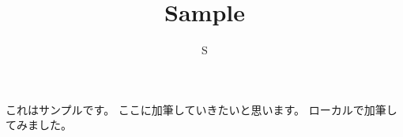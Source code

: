 \documentclass{article}
\title{Sample}
\author{S}
\begin{document}
\maketitle
これはサンプルです。
ここに加筆していきたいと思います。
ローカルで加筆してみました。
\end{document}
